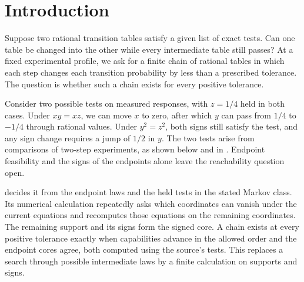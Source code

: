 \begin{abstract}
\noindent
Two rational Markov laws that pass the same exact tests can be
separated by a gap that no sufficiently fine lawful chain can cross.
We give an endpoint criterion for arbitrarily fine rational edits in a
class of marked Markov instruments with a parity mixture and a
conditional register. It checks whether capabilities advance in the
allowed order and whether the endpoint laws have the same signed core
for the tests held at the source. Finite linear feasibility tests
compute the core by finding which coordinates can vanish and keeping
the signs of the survivors. A constraint that pins one response can
cease to restrict it when another response reaches zero. We account
for every possible meeting of sign regions and construct rational
chains that satisfy the equations and bounds exactly. The reachability results are formalized in Lean.
\end{abstract}

\section{Introduction}\label{sec:introduction}

Suppose two rational transition tables satisfy a given list of exact
tests. Can one table be changed into the other while every intermediate
table still passes? At a fixed experimental profile, we ask for a finite
chain of rational tables in which each step changes each transition
probability by less than a prescribed tolerance. The question is whether
such a chain exists for every positive tolerance.

Consider two possible tests on measured responses, with \(z=1/4\) held
in both cases. Under \(xy=xz\), we can move \(x\) to zero, after which
\(y\) can pass from \(1/4\) to \(-1/4\) through rational values.
Under \(y^2=z^2\), both signs still satisfy the test, and any sign change
requires a jump of \(1/2\) in \(y\). The two tests arise from comparisons
of two-step experiments, as shown below and in .
Endpoint feasibility and the signs of the endpoints alone leave the
reachability question open.

 decides it from the endpoint laws and the held tests
in the stated Markov class. Its numerical calculation repeatedly
asks which coordinates can vanish under the current equations and
recomputes those equations on the remaining coordinates. The remaining
support and its signs form the signed core. A chain exists at every
positive tolerance exactly when capabilities advance in the allowed
order and the endpoint cores agree, both computed using the source's
tests.
This replaces a search through possible intermediate laws by a finite
calculation on supports and signs.

